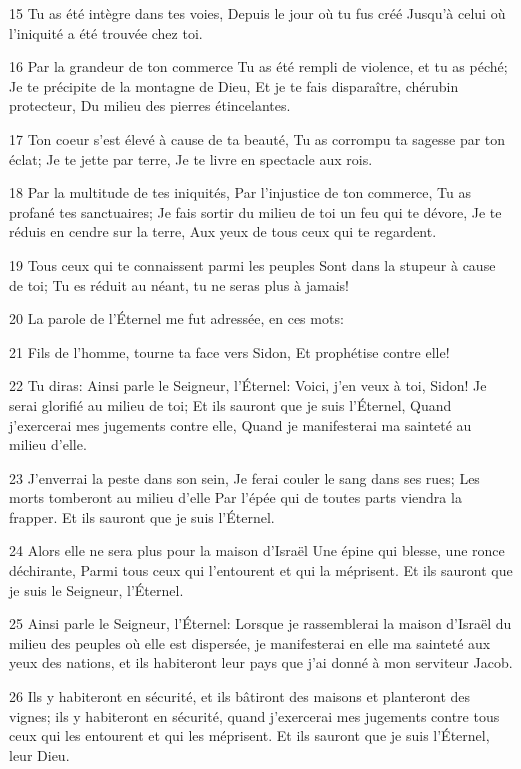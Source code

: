 \par 15 Tu as été intègre dans tes voies, Depuis le jour où tu fus créé Jusqu'à celui où l'iniquité a été trouvée chez toi.
\par 16 Par la grandeur de ton commerce Tu as été rempli de violence, et tu as péché; Je te précipite de la montagne de Dieu, Et je te fais disparaître, chérubin protecteur, Du milieu des pierres étincelantes.
\par 17 Ton coeur s'est élevé à cause de ta beauté, Tu as corrompu ta sagesse par ton éclat; Je te jette par terre, Je te livre en spectacle aux rois.
\par 18 Par la multitude de tes iniquités, Par l'injustice de ton commerce, Tu as profané tes sanctuaires; Je fais sortir du milieu de toi un feu qui te dévore, Je te réduis en cendre sur la terre, Aux yeux de tous ceux qui te regardent.
\par 19 Tous ceux qui te connaissent parmi les peuples Sont dans la stupeur à cause de toi; Tu es réduit au néant, tu ne seras plus à jamais!
\par 20 La parole de l'Éternel me fut adressée, en ces mots:
\par 21 Fils de l'homme, tourne ta face vers Sidon, Et prophétise contre elle!
\par 22 Tu diras: Ainsi parle le Seigneur, l'Éternel: Voici, j'en veux à toi, Sidon! Je serai glorifié au milieu de toi; Et ils sauront que je suis l'Éternel, Quand j'exercerai mes jugements contre elle, Quand je manifesterai ma sainteté au milieu d'elle.
\par 23 J'enverrai la peste dans son sein, Je ferai couler le sang dans ses rues; Les morts tomberont au milieu d'elle Par l'épée qui de toutes parts viendra la frapper. Et ils sauront que je suis l'Éternel.
\par 24 Alors elle ne sera plus pour la maison d'Israël Une épine qui blesse, une ronce déchirante, Parmi tous ceux qui l'entourent et qui la méprisent. Et ils sauront que je suis le Seigneur, l'Éternel.
\par 25 Ainsi parle le Seigneur, l'Éternel: Lorsque je rassemblerai la maison d'Israël du milieu des peuples où elle est dispersée, je manifesterai en elle ma sainteté aux yeux des nations, et ils habiteront leur pays que j'ai donné à mon serviteur Jacob.
\par 26 Ils y habiteront en sécurité, et ils bâtiront des maisons et planteront des vignes; ils y habiteront en sécurité, quand j'exercerai mes jugements contre tous ceux qui les entourent et qui les méprisent. Et ils sauront que je suis l'Éternel, leur Dieu.

